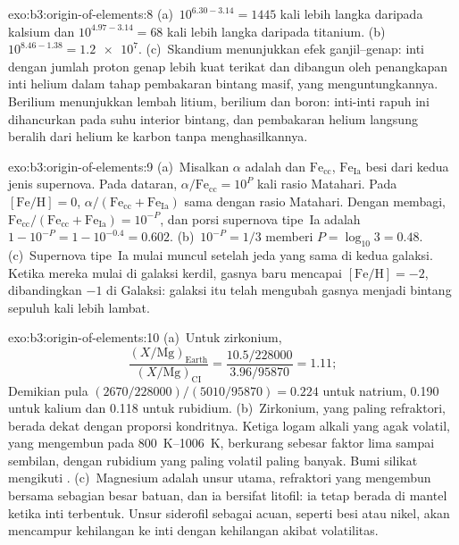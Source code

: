 \begin{solution}{exo:b3:origin-of-elements:8}
(a)~$10^{6.30 - 3.14} = 1445$ kali lebih langka daripada kalsium dan
$10^{4.97 - 3.14} = 68$ kali lebih langka daripada titanium. (b)~$10^{8.46 - 1.38}
= \num{1.2e7}$. (c)~Skandium menunjukkan efek ganjil--genap: inti dengan
jumlah proton genap lebih kuat terikat dan dibangun oleh
penangkapan inti helium dalam tahap pembakaran bintang masif, yang
menguntungkannya. Berilium menunjukkan lembah litium, berilium dan boron:
inti-inti rapuh ini dihancurkan pada suhu interior bintang,
dan pembakaran helium langsung beralih dari helium ke karbon
tanpa menghasilkannya.
\end{solution}

\begin{solution}{exo:b3:origin-of-elements:9}
(a)~Misalkan $\alpha$ adalah  dan $\mathrm{Fe}_\mathrm{cc}$,
$\mathrm{Fe}_\mathrm{Ia}$ besi dari kedua jenis supernova. Pada
dataran, $\alpha/\mathrm{Fe}_\mathrm{cc} = 10^{P}$ kali rasio Matahari.
Pada $[\mathrm{Fe/H}] = 0$, $\alpha/(\mathrm{Fe}_\mathrm{cc} +
\mathrm{Fe}_\mathrm{Ia})$ sama dengan rasio Matahari. Dengan membagi,
$\mathrm{Fe}_\mathrm{cc}/(\mathrm{Fe}_\mathrm{cc} + \mathrm{Fe}_\mathrm{Ia})
= 10^{-P}$, dan porsi supernova tipe~Ia adalah $1 - 10^{-P} = 1 - 10^{-0.4} =
\num{0.602}$. (b)~$10^{-P} = 1/3$ memberi $P = \log_{10}3 = 0.48$.
(c)~Supernova tipe~Ia mulai muncul setelah jeda yang sama di kedua galaksi.
Ketika mereka mulai di galaksi kerdil, gasnya baru mencapai
$[\mathrm{Fe/H}] = -2$, dibandingkan $-1$ di Galaksi: galaksi itu telah mengubah gasnya
menjadi bintang sepuluh kali lebih lambat.
\end{solution}

\begin{solution}{exo:b3:origin-of-elements:10}
(a)~Untuk zirkonium,
\[
\frac{(X/\mathrm{Mg})_\mathrm{Earth}}{(X/\mathrm{Mg})_\mathrm{CI}} =
\frac{10.5/228000}{3.96/95870} = 1.11 ;
\]
Demikian pula $(2670/228000)/(5010/95870) = 0.224$ untuk natrium,
\num{0.190} untuk kalium dan \num{0.118} untuk rubidium. (b)~Zirkonium, yang paling refraktori, berada
dekat dengan proporsi kondritnya. Ketiga logam alkali yang agak volatil,
yang mengembun pada \qtyrange{800}{1006}{K}, berkurang sebesar
faktor lima sampai sembilan, dengan rubidium yang paling volatil paling banyak. Bumi silikat
mengikuti . (c)~Magnesium adalah unsur utama,
refraktori yang mengembun bersama sebagian besar batuan, dan ia bersifat
litofil: ia tetap berada di mantel ketika inti terbentuk. Unsur siderofil
sebagai acuan, seperti besi atau nikel, akan mencampur kehilangan ke inti dengan
kehilangan akibat volatilitas.
\end{solution}

